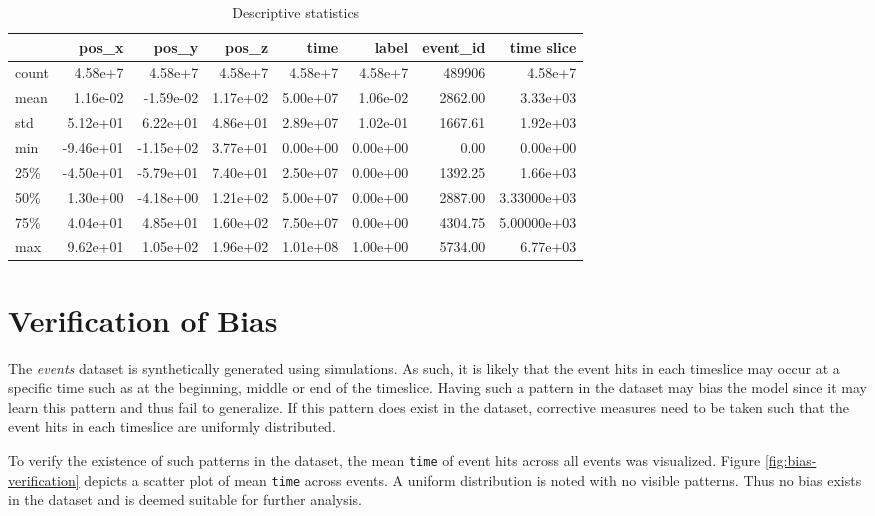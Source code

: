 \begin{table}[t]
  \centering
  \caption{Descriptive statistics}
  \label{tab:desc-stats}
  \begin{tabular}{lrrrrrrr}
    \hline
          & pos\_x & pos\_y & pos\_z & time & label & event\_id & time slice \\
    \hline
    count & 4.58e+7 &  4.58e+7 &  4.58e+7 &  4.58e+7 &  4.58e+7 &  489906 &  4.58e+7 \\
    mean  & 1.16e-02 & -1.59e-02 &  1.17e+02 &  5.00e+07 &  1.06e-02 &    2862.00 &  3.33e+03 \\
    std   & 5.12e+01 &  6.22e+01 &  4.86e+01 &  2.89e+07 &  1.02e-01 &    1667.61 &  1.92e+03 \\
    min   & -9.46e+01 & -1.15e+02 &  3.77e+01 &  0.00e+00 &  0.00e+00 &       0.00 &  0.00e+00 \\
    25\%  & -4.50e+01 & -5.79e+01 &  7.40e+01 &  2.50e+07 &  0.00e+00 &    1392.25 &  1.66e+03 \\
    50\%  & 1.30e+00 & -4.18e+00 &  1.21e+02 &  5.00e+07 &  0.00e+00 &    2887.00 &  3.33000e+03 \\
    75\%  & 4.04e+01 &  4.85e+01 &  1.60e+02 &  7.50e+07 &  0.00e+00 &    4304.75 &  5.00000e+03 \\
    max  & 9.62e+01 &  1.05e+02 &  1.96e+02 &  1.01e+08 &  1.00e+00 &    5734.00 &  6.77e+03 \\
    \hline
  \end{tabular}
\end{table}


\section{Verification of Bias}%
\label{sec:data-exp-verification-bias}

The \emph{events} dataset is synthetically generated using simulations. As such,
it is likely that the event hits in each timeslice may occur at a specific
time such as at the beginning, middle or end of the timeslice. Having such
a pattern in the dataset may bias the model since it may learn this pattern and
thus fail to generalize. If this pattern does exist in the dataset, corrective
measures need to be taken such that the event hits in each timeslice are
uniformly distributed.

To verify the existence of such patterns in the dataset, the mean \texttt{time}
of event hits across all events was visualized. Figure
\ref{fig:bias-verification} depicts a scatter plot of mean \texttt{time} across
events. A uniform distribution is noted with no visible patterns. Thus no bias exists in the dataset and is deemed suitable for further analysis.

